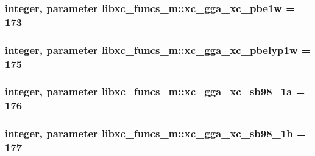 \hypertarget{classlibxc__funcs__m_aae929c8f8786199690271d22e625e7df}{
\subsubsection[{xc\-\_\-gga\-\_\-xc\-\_\-pbe1w}]{\setlength{\rightskip}{0pt plus 5cm}integer, parameter libxc\-\_\-funcs\-\_\-m\-::xc\-\_\-gga\-\_\-xc\-\_\-pbe1w = 173}}\label{classlibxc__funcs__m_aae929c8f8786199690271d22e625e7df}
\hypertarget{classlibxc__funcs__m_a72b8b491aee2ac2ec1357ec005ebf20b}{
\subsubsection[{xc\-\_\-gga\-\_\-xc\-\_\-pbelyp1w}]{\setlength{\rightskip}{0pt plus 5cm}integer, parameter libxc\-\_\-funcs\-\_\-m\-::xc\-\_\-gga\-\_\-xc\-\_\-pbelyp1w = 175}}\label{classlibxc__funcs__m_a72b8b491aee2ac2ec1357ec005ebf20b}
\hypertarget{classlibxc__funcs__m_aafe8927b9bdf87312eab8f3140a5fb15}{
\subsubsection[{xc\-\_\-gga\-\_\-xc\-\_\-sb98\-\_\-1a}]{\setlength{\rightskip}{0pt plus 5cm}integer, parameter libxc\-\_\-funcs\-\_\-m\-::xc\-\_\-gga\-\_\-xc\-\_\-sb98\-\_\-1a = 176}}\label{classlibxc__funcs__m_aafe8927b9bdf87312eab8f3140a5fb15}
\hypertarget{classlibxc__funcs__m_a4b22daa69127be305170871894edbe05}{
\subsubsection[{xc\-\_\-gga\-\_\-xc\-\_\-sb98\-\_\-1b}]{\setlength{\rightskip}{0pt plus 5cm}integer, parameter libxc\-\_\-funcs\-\_\-m\-::xc\-\_\-gga\-\_\-xc\-\_\-sb98\-\_\-1b = 177}}\label{classlibxc__funcs__m_a4b22daa69127be305170871894edbe05}
